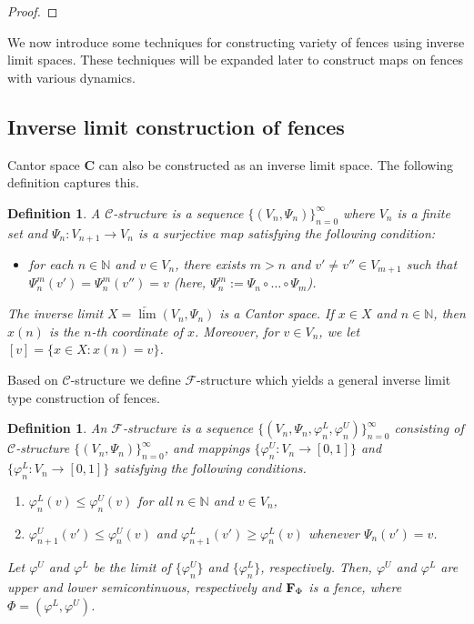 \documentclass[11pt]{amsart}
\newtheorem{definition}[theorem]{Definition}
\newcommand{\N}{\mathbb{N}}  %
\newcommand{\cantor}{\mathbf C}
\newcommand{\fence}{{\bf F}_{\Phi}{}}
\newcommand{\cC}{\mathcal{C}}
\newcommand{\cF}{\mathcal{F}}
\newcommand{\cstructure}{\{(V_n,\Psi_n)\}_{n=0}^{\infty}}
\newcommand{\fstructure}{\{(V_n, \Psi_n,\varphi^L_n,\varphi^U_n)\}_{n=0}^{\infty}}
\begin{document}
{\begin{proof}
    
    
    
    
\end{proof}



We now introduce some techniques for constructing variety of fences using inverse limit spaces. These techniques will be expanded later to construct maps on fences with various dynamics.

\subsection{Inverse limit construction of fences}
Cantor space $\cantor$ can also be constructed as an inverse limit space. The following definition captures this.
\begin{definition}\label{def:cstructure}
    A \emph{$\cC$-structure} is a sequence $\cstructure$ where $V_n$ is a finite set and $\Psi_n:V_{n+1} \rightarrow V_n$ is a surjective map satisfying the following condition:
    \begin{itemize}
        \item for each $n \in \N$ and $v \in V_n$, there exists $m >n$ and $v' \neq v'' \in V_{m+1}$ such that $\Psi_n^m (v') = \Psi_n^m(v'') = v$ (here, $\Psi^m_n:=\Psi_n\circ\ldots \circ \Psi_m$).
    \end{itemize}
    The inverse limit $X =\underleftarrow{\lim} (V_n, \Psi_n)$ is a Cantor space.
    If $x \in X$ and $n \in \N$, then $x(n)$ is the $n$-th coordinate of $x$. Moreover, for $v \in V_n$, we let $[v] = \{x\in X: x(n) = v\}$.
\end{definition}

Based on $\cC$-structure we define $\cF$-structure which yields a general inverse limit type construction of fences.

\begin{definition}\label{def:fstructure} An \emph{ $\cF$-structure} is a sequence $\fstructure$ consisting of $\cC$-structure $\cstructure$, and mappings $\{\varphi^U_n:V_n\to [0,1]\}$ and $\{\varphi^L_n:V_n \to [0,1]\}$ satisfying the following conditions.
    \begin{enumerate}
    \item $\varphi^{L}_n(v) \le \varphi^U_n(v)$ for all $n\in \N$ and $v\in V_n$,
    \item $\varphi^U_{n+1}(v')\leq \varphi^U_{n}(v)$ and $\varphi^L_{n+1}(v')\geq \varphi^L_{n}(v)$  whenever $\Psi_n(v')=v$.
\end{enumerate}
Let $\varphi^U$ and $\varphi^L$ be the limit of $\{\varphi^U_n\}$ and $\{\varphi^L_n\}$, respectively. Then, $\varphi^U$ and $\varphi^L$ are upper and lower semicontinuous, respectively and $\fence$ is a fence, where $\Phi=(\varphi^L,\varphi^U)$.
\end{definition}


}
\end{document}
